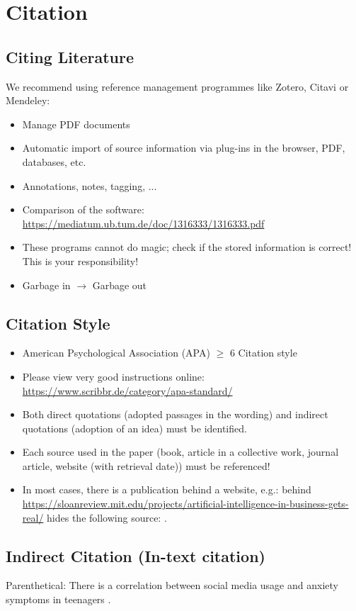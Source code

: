 \section{Citation}

\subsection{Citing Literature}
We recommend using reference management programmes like Zotero, Citavi or Mendeley:
\begin{itemize}
    \item Manage PDF documents
    \item Automatic import of source information via plug-ins in the browser, PDF, databases, etc.
    \item Annotations, notes, tagging, ...
    \item Comparison of the software: \url{https://mediatum.ub.tum.de/doc/1316333/1316333.pdf}
    \item These programs cannot do magic; check if the stored information is correct! This is your responsibility!
    \item Garbage in \( \rightarrow \) Garbage out
\end{itemize}

\subsection{Citation Style}
\begin{itemize}
    \item American Psychological Association (APA) \( \geq \) 6 Citation style
    \item Please view very good instructions online: \url{https://www.scribbr.de/category/apa-standard/}
    \item Both direct quotations (adopted passages in the wording) and indirect quotations (adoption of an idea) must be identified.
    \item Each source used in the paper (book, article in a collective work, journal article, website (with retrieval date)) must be referenced!
    \item In most cases, there is a publication behind a website, e.g.: behind \url{https://sloanreview.mit.edu/projects/artificial-intelligence-in-business-gets-real/} hides the following source: \textcite{ransbotham2018}.
\end{itemize}

\subsection{Indirect Citation (In-text citation)}
Parenthetical: There is a correlation between social media usage and anxiety symptoms in teenagers \parencite{barr1999}.

